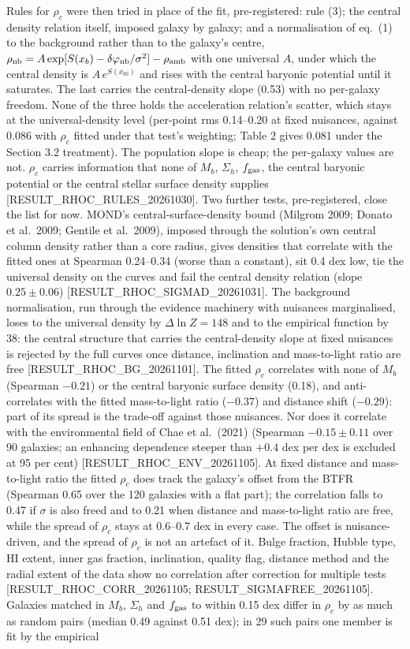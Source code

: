 \documentclass[
  10pt,
]{article}
\begin{document}
Rules for $\rho_c$ were then tried in place of the fit, pre-registered: rule (3); the central density relation itself, imposed galaxy by galaxy; and a normalisation of eq.~(1) to the background rather than to the galaxy's centre, $\rho_{\rm nb}=A\exp[S(x_b)-\delta\varphi_{\rm nb}/\sigma^2]-\rho_{\rm amb}$ with one universal $A$, under which the central density is $A\,e^{S(x_{b0})}$ and rises with the central baryonic potential until it saturates. The last carries the central-density slope (0.53) with no per-galaxy freedom. None of the three holds the acceleration relation's scatter, which stays at the universal-density level (per-point rms 0.14--0.20 at fixed nuisances, against 0.086 with $\rho_c$ fitted under that test's weighting; Table 2 gives 0.081 under the Section 3.2 treatment). The population slope is cheap; the per-galaxy values are not. $\rho_c$ carries information that none of $M_b$, $\Sigma_h$, $f_{\rm gas}$, the central baryonic potential or the central stellar surface density supplies {[}RESULT\_RHOC\_RULES\_20261030{]}. Two further tests, pre-registered, close the list for now. MOND's central-surface-density bound (Milgrom 2009; Donato et al.~2009; Gentile et al.~2009), imposed through the solution's own central column density rather than a core radius, gives densities that correlate with the fitted ones at Spearman 0.24--0.34 (worse than a constant), sit 0.4 dex low, tie the universal density on the curves and fail the central density relation (slope $0.25\pm0.06$) {[}RESULT\_RHOC\_SIGMAD\_20261031{]}. The background normalisation, run through the evidence machinery with nuisances marginalised, loses to the universal density by $\Delta\ln Z=148$ and to the empirical function by 38: the central structure that carries the central-density slope at fixed nuisances is rejected by the full curves once distance, inclination and mass-to-light ratio are free {[}RESULT\_RHOC\_BG\_20261101{]}. The fitted $\rho_c$ correlates with none of $M_b$ (Spearman $-0.21$) or the central baryonic surface density (0.18), and anti-correlates with the fitted mass-to-light ratio ($-0.37$) and distance shift ($-0.29$): part of its spread is the trade-off against those nuisances. Nor does it correlate with the environmental field of Chae et al.~(2021) (Spearman $-0.15\pm0.11$ over 90 galaxies; an enhancing dependence steeper than $+0.4$ dex per dex is excluded at 95 per cent) {[}RESULT\_RHOC\_ENV\_20261105{]}. At fixed distance and mass-to-light ratio the fitted $\rho_c$ does track the galaxy's offset from the BTFR (Spearman 0.65 over the 120 galaxies with a flat part); the correlation falls to 0.47 if $\sigma$ is also freed and to 0.21 when distance and mass-to-light ratio are free, while the spread of $\rho_c$ stays at 0.6--0.7 dex in every case. The offset is nuisance-driven, and the spread of $\rho_c$ is not an artefact of it. Bulge fraction, Hubble type, HI extent, inner gas fraction, inclination, quality flag, distance method and the radial extent of the data show no correlation after correction for multiple tests {[}RESULT\_RHOC\_CORR\_20261105; RESULT\_SIGMAFREE\_20261105{]}. Galaxies matched in $M_b$, $\Sigma_h$ and $f_{\rm gas}$ to within 0.15 dex differ in $\rho_c$ by as much as random pairs (median 0.49 against 0.51 dex); in 29 such pairs one member is fit by the empirical 
\end{document}

